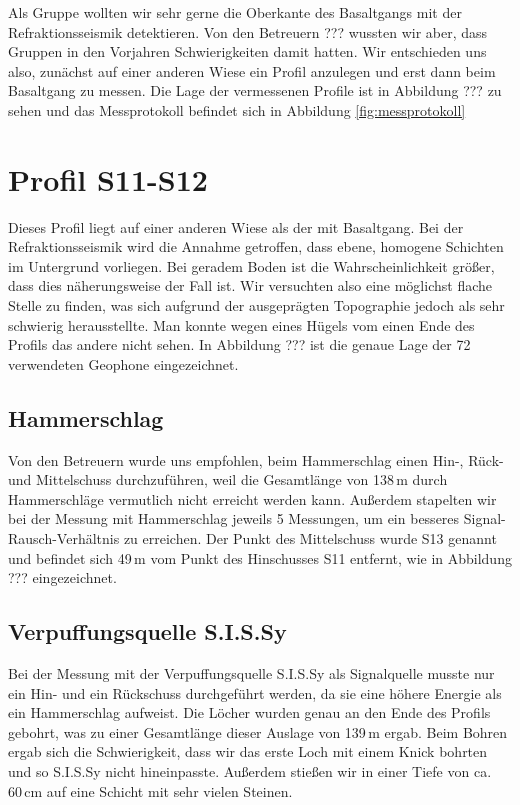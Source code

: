 Als Gruppe wollten wir sehr gerne die Oberkante des Basaltgangs mit der Refraktionsseismik detektieren. Von den Betreuern ??? wussten wir aber, dass Gruppen in den Vorjahren Schwierigkeiten damit hatten. Wir entschieden uns also, zunächst auf einer anderen Wiese ein Profil anzulegen und erst dann beim Basaltgang zu messen. Die Lage der vermessenen Profile ist in Abbildung ??? zu sehen und das Messprotokoll befindet sich in Abbildung \ref{fig:messprotokoll}

\section{Profil S11-S12}

Dieses Profil liegt auf einer anderen Wiese als der mit Basaltgang. Bei der Refraktionsseismik wird die Annahme getroffen, dass ebene, homogene Schichten im Untergrund vorliegen. Bei geradem Boden ist die Wahrscheinlichkeit größer, dass dies näherungsweise der Fall ist. Wir versuchten also eine möglichst flache Stelle zu finden, was sich aufgrund der ausgeprägten Topographie jedoch als sehr schwierig herausstellte. Man konnte wegen eines Hügels vom einen Ende des Profils das andere nicht sehen. In Abbildung ??? ist die genaue Lage der 72 verwendeten Geophone eingezeichnet.

\subsection{Hammerschlag}

Von den Betreuern wurde uns empfohlen, beim Hammerschlag einen Hin-, Rück- und Mittelschuss durchzuführen, weil die Gesamtlänge von 138\,m durch Hammerschläge vermutlich nicht erreicht werden kann. Außerdem stapelten wir bei der Messung mit Hammerschlag jeweils 5 Messungen, um ein besseres Signal-Rausch-Verhältnis zu erreichen. Der Punkt des Mittelschuss wurde S13 genannt und befindet sich 49\,m vom Punkt des Hinschusses S11 entfernt, wie in Abbildung ??? eingezeichnet.

\subsection{Verpuffungsquelle S.I.S.Sy}

Bei der Messung mit der Verpuffungsquelle S.I.S.Sy als  Signalquelle musste nur ein Hin- und ein Rückschuss durchgeführt werden, da sie eine höhere Energie als ein Hammerschlag aufweist. Die Löcher wurden genau an den Ende des Profils gebohrt, was zu einer Gesamtlänge dieser Auslage von 139\,m ergab. Beim Bohren ergab sich die Schwierigkeit, dass wir das erste Loch mit einem Knick bohrten und so S.I.S.Sy nicht hineinpasste. Außerdem stießen wir in einer Tiefe von ca. 60\,cm auf eine Schicht mit sehr vielen Steinen.

